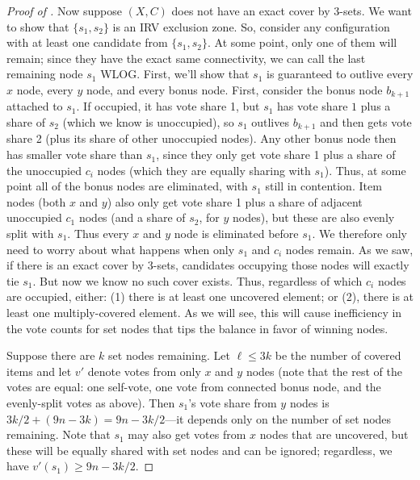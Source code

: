 \documentclass{article}
\theoremstyle{theorem}
\theoremstyle{definition}
\begin{document}
\begin{proof}[Proof of ]
Now suppose $(X, C)$ does not have an exact cover by 3-sets. We want to show that $\{s_1, s_2\}$ is an IRV exclusion zone. So, consider any configuration with at least one candidate from $\{s_1, s_2\}$. At some point, only one of them will remain; since they have the exact same connectivity, we can call the last remaining node $s_1$ WLOG. First, we'll show that $s_1$ is guaranteed to outlive every $x$ node, every $y$ node, and every bonus node. First, consider the bonus node $b_{k+1}$ attached to $s_1$. If occupied, it has vote share 1, but $s_1$ has vote share $1$ plus a share of $s_2$ (which we know is unoccupied), so $s_1$ outlives $b_{k+1}$ and then gets vote share 2 (plus its share of other unoccupied nodes). Any other bonus node then has smaller vote share than $s_1$, since they only get vote share 1 plus a share of the unoccupied $c_i$ nodes (which they are equally sharing with $s_1$). Thus, at some point all of the bonus nodes are eliminated, with $s_1$ still in contention. Item nodes (both $x$ and $y$) also only get vote share 1 plus a share of adjacent unoccupied $c_1$ nodes (and a share of $s_2$, for $y$ nodes), but these are also evenly split with $s_1$. Thus every $x$ and $y$ node is eliminated before $s_1$. We therefore only need to worry about what happens when only $s_1$ and $c_i$ nodes remain. As we saw, if there is an exact cover by 3-sets, candidates occupying those nodes will exactly tie $s_1$. But now we know no such cover exists. Thus, regardless of which $c_i$ nodes are occupied, either: (1) there is at least one uncovered element; or (2), there is at least one multiply-covered element. As we will see, this will cause inefficiency in the vote counts for set nodes that tips the balance in favor of winning nodes.

Suppose there are $k$ set nodes remaining. Let $\ell \le 3k$ be the number of covered items and let $v'$ denote votes from only $x$ and $y$ nodes (note that the rest of the votes are equal: one self-vote, one vote from connected bonus node, and the evenly-split votes as above).  Then $s_1$'s vote share from $y$ nodes is $3k/2 + (9n - 3k) = 9n - 3k/2$---it depends only on the number of set nodes remaining. Note that $s_1$ may also get votes from $x$ nodes that are uncovered, but these will be equally shared with set nodes and can be ignored; regardless, we have $v'(s_1) \ge 9n - 3k/2$.


\end{proof}
\end{document}
